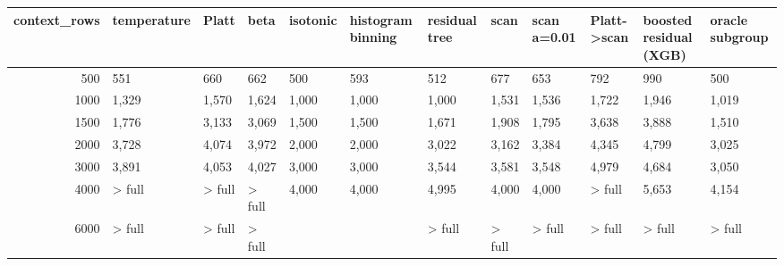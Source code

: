\begin{tabular}{rlllllllllll}
\toprule
context_rows & temperature & Platt & beta & isotonic & histogram binning & residual tree & scan & scan a=0.01 & Platt->scan & boosted residual (XGB) & oracle subgroup \\
\midrule
500 & 551 & 660 & 662 & 500 & 593 & 512 & 677 & 653 & 792 & 990 & 500 \\
1000 & 1,329 & 1,570 & 1,624 & 1,000 & 1,000 & 1,000 & 1,531 & 1,536 & 1,722 & 1,946 & 1,019 \\
1500 & 1,776 & 3,133 & 3,069 & 1,500 & 1,500 & 1,671 & 1,908 & 1,795 & 3,638 & 3,888 & 1,510 \\
2000 & 3,728 & 4,074 & 3,972 & 2,000 & 2,000 & 3,022 & 3,162 & 3,384 & 4,345 & 4,799 & 3,025 \\
3000 & 3,891 & 4,053 & 4,027 & 3,000 & 3,000 & 3,544 & 3,581 & 3,548 & 4,979 & 4,684 & 3,050 \\
4000 & > full & > full & > full & 4,000 & 4,000 & 4,995 & 4,000 & 4,000 & > full & 5,653 & 4,154 \\
6000 & > full & > full & > full &  &  & > full & > full & > full & > full & > full & > full \\
\bottomrule
\end{tabular}
